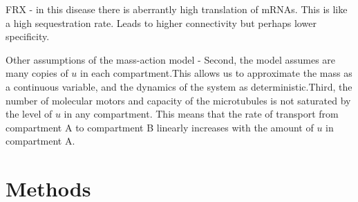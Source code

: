 \documentclass[10pt]{wlpeerj}
\begin{document}
FRX - in this disease there is aberrantly high translation of mRNAs. This is like a high sequestration rate. Leads to higher connectivity but perhaps lower specificity.

Other assumptions of the mass-action model - Second, the model assumes are many copies of $u$ in each compartment.This allows us to approximate the mass as a continuous variable, and the dynamics of the system as deterministic.Third, the number of molecular motors and capacity of the microtubules is not saturated by the level of $u$ in any compartment. This means that the rate of transport from compartment A to compartment B linearly increases with the amount of $u$ in compartment A.

\section*{Methods}
\end{document}
